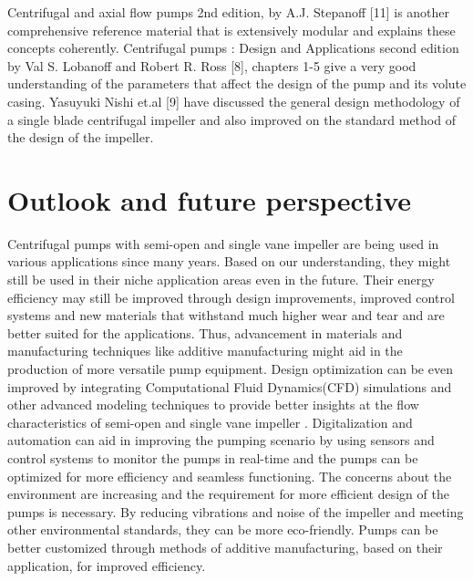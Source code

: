 \documentclass[11pt,a4paper]{scrartcl}
\begin{document}
Centrifugal and axial flow pumps 2nd edition, by A.J. Stepanoff [11] is another comprehensive reference material that is extensively modular and explains these concepts coherently. Centrifugal pumps : Design and Applications second edition by Val S. Lobanoff and Robert R. Ross [8], chapters 1-5 give a very good understanding of the parameters that affect the design of the pump and its volute casing. Yasuyuki Nishi et.al [9] have discussed the general design methodology of a single blade centrifugal impeller and also improved on the standard method of the design of the impeller.


\section{Outlook and future perspective}
Centrifugal pumps with semi-open and single vane impeller are being used in various applications since many years. Based on our understanding, they might still be used in their niche application areas even in the future. Their energy efficiency may still be improved through design improvements, improved control systems and new materials that withstand much higher wear and tear and are better suited for the applications. Thus, advancement  in materials and manufacturing techniques like additive manufacturing might aid in the production of more versatile pump equipment. Design optimization can be even improved by integrating Computational Fluid Dynamics(CFD) simulations and other advanced modeling techniques to provide better insights at the flow characteristics of semi-open and single vane impeller . Digitalization and automation can aid in improving the pumping scenario by using sensors and control systems to monitor the pumps in real-time and the pumps can be optimized for more efficiency and seamless functioning. The concerns about the environment are increasing and the requirement for more efficient design of the pumps is necessary. By reducing vibrations and noise of the impeller and meeting other environmental standards, they can be more eco-friendly.  Pumps can be better customized through methods of additive manufacturing, based on their application, for improved efficiency. 



  \nocite{*}






\vfill
\end{document}

